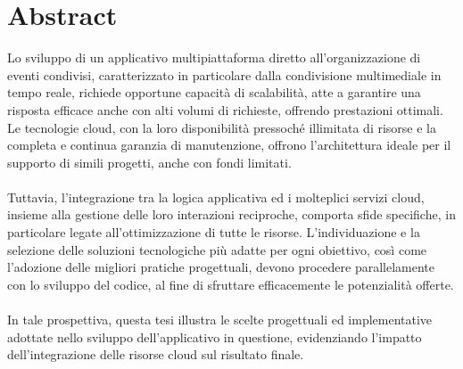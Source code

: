 

\chapter*{Abstract}


Lo sviluppo di un applicativo multipiattaforma diretto all’organizzazione di eventi condivisi, caratterizzato in particolare dalla condivisione multimediale in tempo reale, 
richiede opportune capacità di scalabilità, atte a garantire una risposta efficace anche con alti volumi di richieste, offrendo prestazioni ottimali. 
Le tecnologie cloud, con la loro disponibilità pressoché illimitata di risorse e la completa e continua garanzia  di manutenzione, 
offrono l'architettura ideale per il supporto di simili progetti, anche con fondi limitati.\\
\\
Tuttavia, l'integrazione tra la logica applicativa ed i molteplici servizi cloud, 
insieme alla gestione delle loro interazioni reciproche, comporta sfide specifiche, 
in particolare legate all'ottimizzazione di tutte le risorse.
L’individuazione e la selezione delle soluzioni tecnologiche più adatte per ogni obiettivo, 
così come l'adozione delle migliori pratiche progettuali,
 devono procedere parallelamente con lo sviluppo del codice, 
 al fine di sfruttare efficacemente le potenzialità offerte.\\
\\
In tale prospettiva, 
questa tesi illustra le scelte progettuali ed implementative adottate nello sviluppo dell'applicativo in questione, 
evidenziando l’impatto dell'integrazione delle risorse cloud sul risultato finale.\\
\clearpage